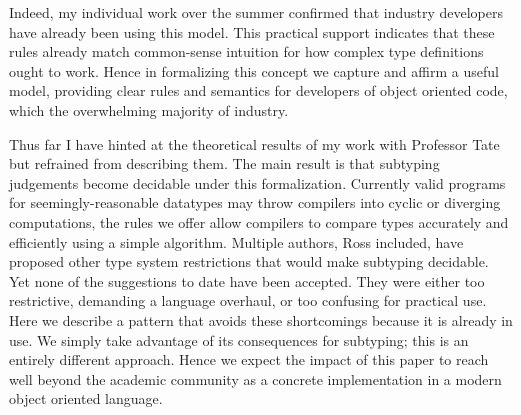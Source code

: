 \documentclass{article}
\begin{document}
Indeed, my individual work over the summer confirmed that industry developers have already been using this model.
This practical support indicates that these rules already match common-sense intuition for how complex type definitions ought to work.
Hence in formalizing this concept we capture and affirm a useful model, providing clear rules and semantics for developers of object oriented code, which the overwhelming majority of industry.

Thus far I have hinted at the theoretical results of my work with Professor Tate but refrained from describing them.
The main result is that subtyping judgements become decidable under this formalization. 
Currently valid programs for seemingly-reasonable datatypes may throw compilers into cyclic or diverging computations, the rules we offer allow compilers to compare types accurately and efficiently using a simple algorithm.
Multiple authors, Ross included, have proposed other type system restrictions that would make subtyping decidable. 
Yet none of the suggestions to date have been accepted.
They were either too restrictive, demanding a language overhaul, or too confusing for practical use.
Here we describe a pattern that avoids these shortcomings because it is already in use.
We simply take advantage of its consequences for subtyping; this is an entirely different approach.
Hence we expect the impact of this paper to reach well beyond the academic community as a concrete implementation in a modern object oriented language.
\end{document}
